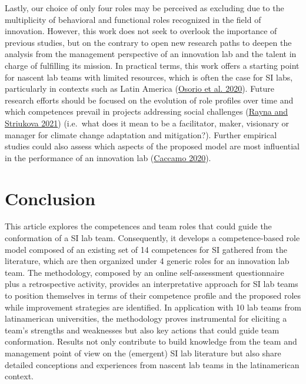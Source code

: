 \documentclass[AMA,STIX1COL,APA,STIX2COL]{WileyNJD-v2}
\begin{document}
Lastly, our choice of only four roles may be perceived as excluding due
to the multiplicity of behavioral and functional roles recognized in the
field of innovation. However, this work does not seek to overlook the
importance of previous studies, but on the contrary to open new research
paths to deepen the analysis from the management perspective of an
innovation lab and the talent in charge of fulfilling its mission. In
practical terms, this work offers a starting point for nascent lab teams
with limited resources, which is often the case for SI labs,
particularly in contexts such as Latin America
(\protect\hyperlink{ref-Osorio2020}{Osorio et al. 2020}). Future
research efforts should be focused on the evolution of role profiles
over time and which competences prevail in projects addressing social
challenges (\protect\hyperlink{ref-Rayna2021}{Rayna and Striukova 2021})
(i.e.~what does it mean to be a facilitator, maker, visionary or manager
for climate change adaptation and mitigation?). Further empirical
studies could also assess which aspects of the proposed model are most
influential in the performance of an innovation lab
(\protect\hyperlink{ref-Caccamo2020}{Caccamo 2020}).

\hypertarget{conclusion}{%
\section{Conclusion}\label{conclusion}}

This article explores the competences and team roles that could guide
the conformation of a SI lab team. Consequently, it develops a
competence-based role model composed of an existing set of 14
competences for SI gathered from the literature, which are then
organized under 4 generic roles for an innovation lab team. The
methodology, composed by an online self-assessment questionnaire plus a
retrospective activity, provides an interpretative approach for SI lab
teams to position themselves in terms of their competence profile and
the proposed roles while improvement strategies are identified. In
application with 10 lab teams from latinamerican universities, the
methodology proves instrumental for eliciting a team's strengths and
weaknesses but also key actions that could guide team conformation.
Results not only contribute to build knowledge from the team and
management point of view on the (emergent) SI lab literature but also
share detailed conceptions and experiences from nascent lab teams in the
latinamerican context.
\end{document}
